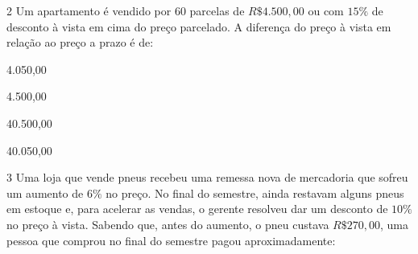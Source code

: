 
\num{2} Um apartamento é vendido por 60 parcelas de $R\$4.500,00$ ou com
$15\%$ de desconto à vista em cima do preço parcelado. A diferença do
preço à vista em relação ao preço a prazo é de:

\begin{escolha}
    \item 4.050,00

    \item 4.500,00

    \item 40.500,00

    \item 40.050,00
\end{escolha}



\num{3} Uma loja que vende pneus recebeu uma remessa nova de mercadoria que
sofreu um aumento de $6\%$ no preço. No final do semestre, ainda restavam
alguns pneus em estoque e, para acelerar as vendas, o gerente resolveu
dar um desconto de $10\%$ no preço à vista. Sabendo que, antes do aumento,
o pneu custava $R\$270,00$, uma pessoa que comprou no final do semestre
pagou aproximadamente:

